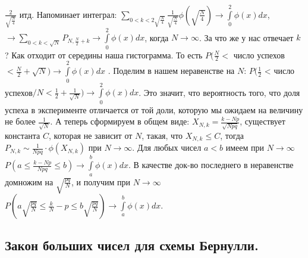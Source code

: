 $\frac{2}{\sqrt{\frac{N}{4}}}$ итд. Напоминает интеграл: $\sum\limits_{0 < k < 2\sqrt{\frac{N}{4}}} \frac{1}{\sqrt{\frac{N}{4}}} \phi(\sqrt{\frac{N}{4}}) \to \int\limits_{0}^{2} \phi(x) dx$, $\xrightarrow{} \sum\limits_{0 < k < \sqrt{N}} P_{N, \frac{N}{2} + k} \to \int\limits_{0}^{2} \phi(x) dx$, когда $N \to \infty$. За что же у нас отвечает $k$? Как отходит от середины наша гистограмма. То есть $P(\frac{N}{2} < $ число успехов $< \frac{N}{2} + \sqrt{N}) \to \int\limits_{0}^{2} \phi(x) dx$ . Поделим в нашем неравенстве на $N$: $P(\frac{1}{2}$ < число успехов$/N < \frac{1}{2} + \frac{1}{\sqrt{N}}) \to \int\limits_{0}^{2} \phi(x) dx$. Это значит, что вероятность того, что доля успеха в эксперименте отличается от той доли, которую мы ожидаем на величину не более $\frac{1}{\sqrt{N}}$. А теперь сформируем в общем виде: $X_{N,k} = \frac{k - Np}{\sqrt{Npq}}$, существует константа $C$, которая не зависит от $N$, такая, что $X_{N,k} \leq C$, тогда $P_{N,k} \sim \frac{1}{Npq} \cdot \phi(X_{N,k})$ при $N \to \infty$. Для любых чисел $a < b$ имеем при $N \to \infty$ $P(a \leq \frac{k - Np}{Npq} \leq b) \to \int\limits_{a}^{b} \phi(x) dx$. В качестве док-во последнего в неравенстве домножим на $\sqrt{\frac{pq}{N}}$, и получим при $N \to \infty$ $P(a\sqrt{\frac{pq}{N}} \leq \frac{k}{N} - p \leq b\sqrt{\frac{pq}{N}}) \to \int\limits_{a}^{b} \phi(x) dx$.

\subsection{Закон больших чисел для схемы Бернулли.}